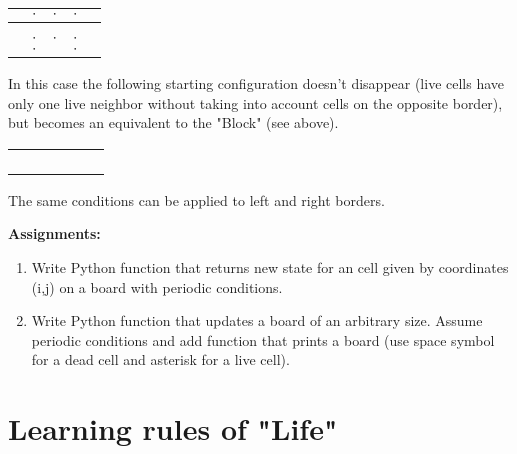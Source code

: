 \begin{center}
\begin{tabular}{c|c|c|c|c}
\hline
 & $\cdot$ & $\cdot$ & $\cdot$ & \\
\hline
 & & & & \\
 & & & & \\
\hline
 & $\cdot$ & $\cdot$ & $\cdot$ & \\
\hline
 & $\cdot$ & \cellcolor{black} & $\cdot$ & \\
\hline
\end{tabular}
\end{center}

In this case the following starting configuration doesn't disappear
(live cells have only one live neighbor without taking into account
cells on the opposite border), but becomes an equivalent to the "Block"
(see above).

\begin{center}
\begin{tabular}{c|c|c|c|c|c}
\hline
 & & \cellcolor{black} & \cellcolor{black} & & \\
\hline
 & & & & & \\
\hline
 & & & & & \\
\hline
 & & & & & \\
\hline
 & & \cellcolor{black} & \cellcolor{black} & & \\ 
\hline
\end{tabular}
\end{center}

The same conditions can be applied to left and right borders.

\begin{tcolorbox}
\textbf{Assignments:}
\begin{enumerate}
\item Write Python function that returns new state for an cell
given by coordinates (i,j) on a board with periodic conditions.
\item Write Python function that updates a board of an arbitrary
size. Assume periodic conditions and add function that prints
a board (use space symbol for a dead cell and asterisk for a live cell).
\end{enumerate}
\end{tcolorbox}

\section{Learning rules of "Life"}

